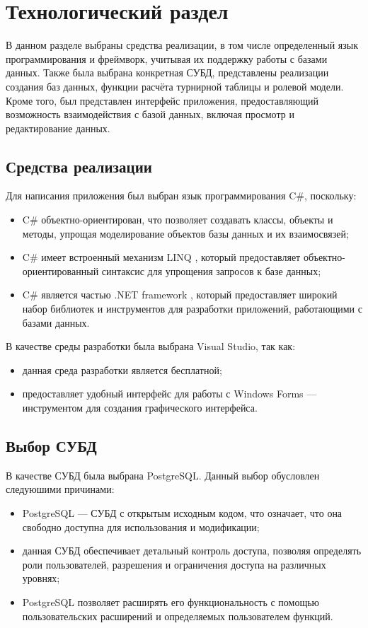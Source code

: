 \section{Технологический раздел}
В данном разделе выбраны средства реализации, в том числе определенный язык программирования и фреймворк, учитывая их поддержку работы с базами данных. Также была выбрана конкретная СУБД, представлены реализации создания баз данных, функции расчёта турнирной таблицы и ролевой модели. Кроме того, был представлен интерфейс приложения, предоставляющий возможность взаимодействия с базой данных, включая просмотр и редактирование данных.
\subsection{Средства реализации}
Для написания приложения был выбран язык программирования C\#, поскольку:
\begin{itemize}
    \item C\# объектно-ориентирован, что позволяет создавать классы, объекты и методы, упрощая моделирование объектов базы данных и их взаимосвязей;
    \item C\# имеет встроенный механизм LINQ \cite{linq}, который предоставляет объектно-ориентированный синтаксис для упрощения запросов к базе данных;
    \item C\# является частью .NET framework \cite{net}, который предоставляет широкий набор библиотек и инструментов для разработки приложений, работающими с базами данных.
\end{itemize}

В качестве среды разработки была выбрана Visual Studio, так как:
\begin{itemize}
    \item данная среда разработки является бесплатной;
    \item предоставляет удобный интерфейс для работы с Windows Forms \cite{forms} --- инструментом для создания графического интерфейса.
\end{itemize}

\subsection{Выбор СУБД}

В качестве СУБД была выбрана PostgreSQL. Данный выбор обусловлен следуюшими причинами:
\begin{itemize}
    \item PostgreSQL --- СУБД с открытым исходным кодом, что означает, что она свободно доступна для использования и модификации;
    \item данная СУБД обеспечивает детальный контроль доступа, позволяя определять роли пользователей, разрешения и ограничения доступа на различных уровнях;
    \item PostgreSQL позволяет расширять его функциональность с помощью пользовательских расширений и определяемых пользователем функций.
\end{itemize}

